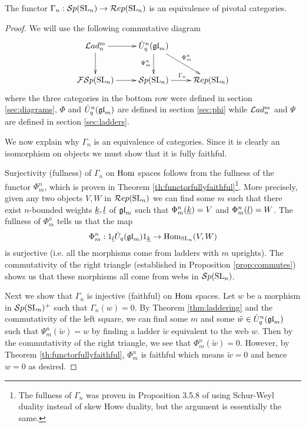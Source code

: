 \documentclass[11pt,leqno]{article}
\begin{document}
\begin{thm}\label{thm:main}
The functor $\Gamma_n: {\mathcal{S}p}({\rm{SL}}_n) \rightarrow \mathcal{R}ep({\rm{SL}}_n)$ is an equivalence of pivotal categories.
\end{thm}
\begin{proof}
We will use the following commutative diagram
\begin{equation}\label{diag:main}
\xymatrix{
\Lad_n^m \ar[r] \ar[d] & \dU^n(\gl_m) \ar[dr]^{\Phi_m^n} \ar[d]_{\Psi_m^n} & \\
\FSp(\SL_n) \ar[r] & \Sp(\SL_n) \ar[r]^{\Gamma_n} & \Rep(\SL_n) \\
}
\end{equation}
where the three categories in the bottom row were defined in section \ref{sec:diagrams}, $\Phi$ and $\dot{{{U}}}_q^n({\mathfrak{gl}}_m)$ are defined in section \ref{sec:phi} while $\mathcal{L}ad_n^m$ and $\Psi$ are defined in section \ref{sec:ladders}.

We now explain why $\Gamma_n$ is an equivalence of categories. Since it is clearly an isomorphism on objects we must show that it is fully faithful.

Surjectivity (fullness) of $\Gamma_n$ on $\operatorname{Hom}$ spaces follows from the fullness of the functor $ \Phi^n_m $, which is proven in Theorem \ref{th:functorfullyfaithful}\footnote{The fullness of $\Gamma_n$ was proven in Proposition 3.5.8 of \cite{0704.1503} using Schur-Weyl duality instead of skew Howe duality, but the argument is essentially the same.}.  More precisely, given any two objects $ V, W $ in $\mathcal{R}ep({\rm{SL}}_n) $ we can find some $m$ such that there exist $ n$-bounded weights $ {\underline{k}}, {\underline{l}} $ of $ {\mathfrak{gl}}_m$ such that $\Phi^n_m({\underline{k}}) = V$ and $\Phi^n_m({\underline{l}}) = W $. The fullness of $ \Phi^n_m $ tells us that the map
$$ \Phi^n_m : 1_{{\underline{l}}} \dot{{{U}}}_q({\mathfrak{gl}}_m) 1_{{\underline{k}}} \rightarrow \operatorname{Hom}_{{\rm{SL}}_n}(V, W) $$
is surjective (i.e. all the morphisms come from ladders with $m$ uprights). The commutativity of the right triangle (established in Proposition \ref{prop:commutes}) shows us that these morphisms all come from webs in $ {\mathcal{S}p}({\rm{SL}}_n) $.

Next we show that $ \Gamma_n $ is injective (faithful) on $ \operatorname{Hom}$ spaces.   Let $w$ be a morphism in $ {\mathcal{S}p}({\rm{SL}}_n)^+ $ such that $\Gamma_n(w)=0$.  By Theorem \ref{thm:laddering} and the commutativity of the left square, we can find some $ m $ and some $\tilde{w} \in \dot{{{U}}}_q^n({\mathfrak{gl}}_m) $ such that $ \Psi^n_m(\tilde{w}) = w $ by finding a ladder $ \tilde{w} $ equivalent to the web $ w $. Then by the commutativity of the right triangle, we see that $ \Phi^n_m(\tilde{w}) = 0 $.  However, by Theorem \ref{th:functorfullyfaithful}, $\Phi_m^n$ is faithful which means $\tilde{w}=0$ and hence $w=0$ as desired.
\end{proof}
\end{document}
